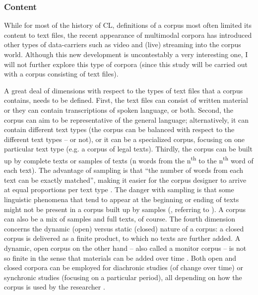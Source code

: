 \subsubsection{Content}
While for most of the history of CL, definitions of a corpus most often limited its content to text files, the recent appearance of multimodal corpora has introduced other types of data-carriers such as video and (live) streaming into the corpus world. Although this new development is uncontestably a very interesting one, I will not further explore this type of corpora (since this study will be carried out with a corpus consisting of text files).

A great deal of dimensions with respect to the types of text files that a corpus contains, needs to be defined. First, the text files can consist of written material or they can contain transcriptions of spoken language, or both. Second, the corpus can aim to be representative of the general language; alternatively, it can contain different text types (the corpus can be balanced with respect to the different text types – or not), or it can be a specialized corpus, focusing on one particular text type (e.g. a corpus of legal texts). Thirdly, the corpus can be built up by complete texts or samples of texts (n words from the n\textsuperscript{th} to the n\textsuperscript{th} word of each text). The advantage of sampling is that “the number of words from each text can be exactly matched”, making it easier for the corpus designer to arrive at equal proportions per text type \citep[77]{deignan_metaphor_2005}. The danger with sampling is that some linguistic phenomena that tend to appear at the beginning or ending of texts might not be present in a corpus built up by samples (\citealt[77]{deignan_metaphor_2005}, referring to \citealt{stubbs_text_1996}). A corpus can also be a mix of samples and full texts, of course. The fourth dimension concerns the dynamic (open) versus static (closed) nature of a corpus: a closed corpus is delivered as a finite product, to which no texts are further added. A dynamic, open corpus on the other hand – also called a monitor corpus – is not so finite in the sense that materials can be added over time \citep[6]{mcenery_corpus_2012}. Both open and closed corpora can be employed for diachronic studies (of change over time) or synchronic studies (focusing on a particular period), all depending on how the corpus is used by the researcher \citep[3]{johansson_role_1998}.

